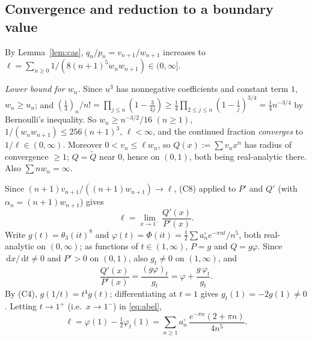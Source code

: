 \documentclass[11pt]{amsart}
\theoremstyle{definition}
\theoremstyle{remark}
\numberwithin{equation}{section}
\newcommand{\dd}{\,\mathrm{d}}
\begin{document}
\subsection{Convergence and reduction to a boundary value}
By Lemma~\ref{lem:cas}, $q_n/p_n=v_{n+1}/w_{n+1}$ increases to $\ell=\sum_{n\ge0}1/(8(n+1)^5w_nw_{n+1})\in(0,\infty]$.

\emph{Lower bound for $w_n$.} Since $u^3$ has nonnegative coefficients and constant term $1$, $w_n\ge u_n$; and $(\frac14)_n/n!=\prod_{j\le n}(1-\frac3{4j})\ge\frac14\prod_{2\le j\le n}(1-\frac1j)^{3/4}=\frac14n^{-3/4}$ by Bernoulli's inequality. So $w_n\ge n^{-3/2}/16$ $(n\ge1)$, $1/(w_nw_{n+1})\le256(n+1)^3$, $\ell<\infty$, and the continued fraction \emph{converges} to $1/\ell\in(0,\infty)$. Moreover $0<v_n\le\ell w_n$, so $Q(x):=\sum v_nx^n$ has radius of convergence $\ge1$; $Q=\tilde Q$ near $0$, hence on $(0,1)$, both being real-analytic there. Also $\sum nw_n=\infty$.

Since $(n+1)v_{n+1}/((n+1)w_{n+1})\to\ell$, (C8) applied to $P'$ and $Q'$ (with $\alpha_n=(n+1)w_{n+1}$) gives
\begin{equation}\label{eq:abel}
\ell=\lim_{x\to1^-}\frac{Q'(x)}{P'(x)}.
\end{equation}
Write $g(t)=\theta_3(it)^8$ and $\varphi(t)=\Phi(it)=\frac12\sum a^\circ_ne^{-\pi nt}/n^5$, both real-analytic on $(0,\infty)$; as functions of $t\in(1,\infty)$, $P=g$ and $Q=g\varphi$. Since $\dd x/\dd t\neq0$ and $P'>0$ on $(0,1)$, also $g_t\neq0$ on $(1,\infty)$, and
\[
\frac{Q'(x)}{P'(x)}=\frac{(g\varphi)_t}{g_t}=\varphi+\frac{g\,\varphi_t}{g_t}.
\]
By (C4), $g(1/t)=t^4g(t)$; differentiating at $t=1$ gives $g_t(1)=-2g(1)\neq0$. Letting $t\to1^+$ (i.e.\ $x\to1^-$) in \eqref{eq:abel},
\begin{equation}\label{eq:boundary}
\ell=\varphi(1)-\tfrac12\varphi_t(1)=\sum_{n\ge1}a^\circ_n\,\frac{e^{-\pi n}(2+\pi n)}{4n^5}.
\end{equation}
\end{document}
